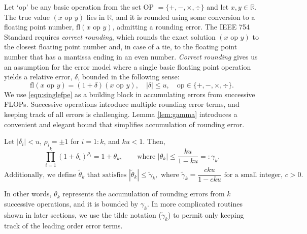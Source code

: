 \documentclass[review,onefignum,onetabnum]{siamart190516}
\newcommand{\R}{\mathbb{R}}
\newcommand{\dd}{\delta}
\newcommand{\tth}{\theta}
\newcommand{\fl}{\mathrm{fl}}
\begin{document}
Let `op' be any basic operation from the set OP $=\{+, -, \times, \div\}$ and let $x,y\in \R$.
The true value $(x\text{ op }y)$ lies in $\R$, and it is rounded using some conversion to a floating point number, $\fl(x\text{ op }y)$, admitting a rounding error. 
The IEEE 754 Standard requires \emph{correct rounding}, which rounds the exact solution $(x\text{ op }y)$ to the closest floating point number and, in case of a tie, to the floating point number that has a mantissa ending in an even number.
\emph{Correct rounding} gives us an assumption for the error model where a single basic floating point operation yields a relative error, $\dd$, bounded in the following sense:
\begin{equation}
\fl(x\text{ op }y) = (1 + \dd)(x\text{ op }y),\quad |\dd|\leq u, \quad \text{op}\in\{+, -, \times, \div\}. \label{eqn:singlefpe}
\end{equation}
We use \cref{eqn:singlefpe} as a building block in accumulating errors from successive FLOPs.
Successive operations introduce multiple rounding error terms, and keeping track of all errors is challenging.
Lemma \ref{lem:gamma} introduces a convenient and elegant bound that simplifies accumulation of rounding error. 
\begin{lemma}
	\label{lem:gamma}
	Let $|\dd_i|<u$, $\rho_i =\pm 1$ for $i=1:k$, and $ku < 1$. Then, 
	\begin{equation}
	\prod_{i=1}^k (1+\dd_i)^{\rho_i} = 1 + \tth_{k},
	\qquad \mbox{where } |\tth_{k}|\leq \frac{ku}{1-ku}=:\gamma_{k}.
	\end{equation}
	$$\mbox{Additionally, we define $\tilde{\tth}_k$ that satisfies }|\tilde{\tth}_k| \leq \tilde{\gamma}_k,\mbox{ where } \tilde{\gamma}_{k} = \frac{cku}{1-cku} \mbox{ for a small integer, $c>0$.}$$
\end{lemma}
In other words, $\tth_{k}$ represents the accumulation of rounding errors from $k$ successive operations, and it is bounded by $\gamma_{k}$. 
In more complicated routines shown in later sections, we use the tilde notation ($\tilde{\gamma}_k$) to permit only keeping track of the leading order error terms.
\end{document}
